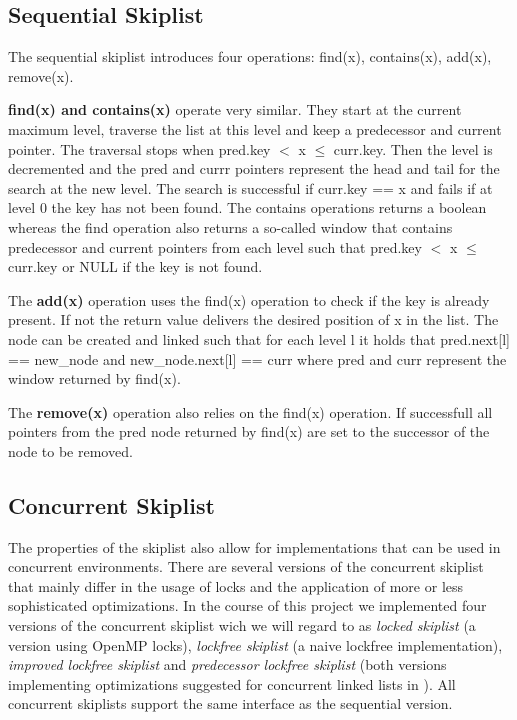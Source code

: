 \documentclass{article}
\begin{document}
\subsection{Sequential Skiplist}
The sequential skiplist introduces four operations: find(x), contains(x), add(x), remove(x). \par \medskip

\noindent \textbf{find(x) and contains(x)} operate very similar. They start at the current maximum level, traverse the list at this level and keep a predecessor and current pointer. The traversal stops when pred.key $<$ x $\leq$ curr.key. Then the level is decremented and the pred and currr pointers represent the head and tail for the search at the new level. The search is successful if curr.key == x and fails if at level 0 the key has not been found. The contains operations returns a boolean whereas the find operation also returns a so-called window that contains predecessor and current pointers from each level such that pred.key $<$ x $\leq$ curr.key or NULL if the key is not found. \par \medskip

\noindent The \textbf{add(x)} operation uses the find(x) operation to check if the key is already present. If not the return value delivers the desired position of x in the list. The node can be created and linked such that for each level l it holds that pred.next[l] == new\_node and new\_node.next[l] == curr where pred and curr represent the window returned by find(x). \par \medskip

\noindent The \textbf{remove(x)} operation also relies on the find(x) operation. If successfull all pointers from the pred node returned by find(x) are set to the successor of the node to be removed. 

\subsection{Concurrent Skiplist}
The properties of the skiplist also allow for implementations that can be used in concurrent environments. There are several versions of the concurrent skiplist that mainly differ in the usage of locks and the application of more or less sophisticated optimizations. In the course of this project we implemented four versions of the concurrent skiplist wich we will regard to as \textit{locked skiplist} (a version using OpenMP locks), \textit{lockfree skiplist} (a naive lockfree implementation), \textit{improved lockfree skiplist} and \textit{predecessor lockfree skiplist} (both versions implementing optimizations suggested for concurrent linked lists in \cite{improvements}). All concurrent skiplists support the same interface as the sequential version.
\end{document}

